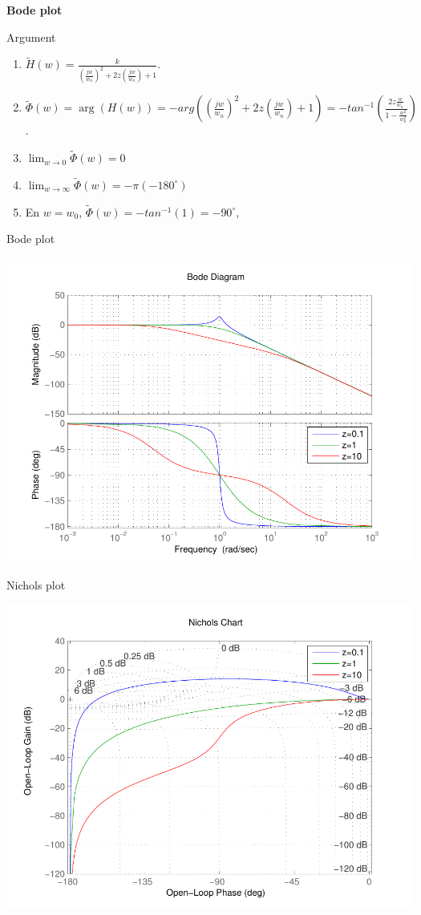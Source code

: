       \textbf{Bode plot}
  \begin{block}{Argument}
\pause
\begin{enumerate}
\item $\tilde H(w)= \frac{k}{\left(\frac{jw}{w_n}\right)^2+2z\left(\frac{jw}{w_n}\right)+1}$.
\item $\tilde \Phi(w)=\arg(H(w))=-arg(\left(\frac{jw}{w_n}\right)^2+2z\left(\frac{jw}{w_n}\right)+1)=-tan^{-1}\left(\frac{2z\frac{w}{w_n}}{1-\frac{w^2}{w_n^2}}\right)$.
\item  $\lim_{w\rightarrow 0}
\tilde  \Phi(w)=0$
\item   $\lim_{w\rightarrow\infty}\tilde \Phi(w)=-\pi(-180^\circ )$
\item  En $w=w_0$, $\tilde \Phi(w)=-tan^{-1}(1)=-90^\circ$, 
\end{enumerate}

  \end{block}

  \begin{block}{Bode plot}
    \begin{center}
      \includegraphics[width=.8\linewidth]{imgs/fourier/bode_2o}
    \end{center}
  \end{block}

  \begin{block}{Nichols plot}
    \begin{center}
      \includegraphics[width=.8\linewidth]{imgs/fourier/nichols_2o}
    \end{center}
  \end{block}

